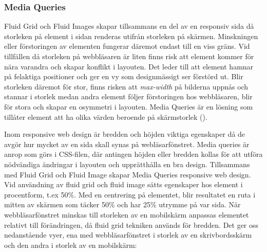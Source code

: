 \documentclass[11pt]{article}
\begin{document}
\subsubsection{Media Queries}
Fluid Grid och Fluid Images skapar tillsammans en del av en responsiv sida då storleken på element i sidan renderas utifrån storleken på skärmen. Minskningen eller förstoringen av elementen fungerar däremot endast till en viss gräns. Vid tillfällen då storleken på webbläsaren är liten finns risk att element kommer för nära varandra och skapar konflikt i layouten. Det leder till att element hamnar på felaktiga positioner och ger en vy som designmässigt ser förstörd ut. Blir storleken däremot för stor, finns risken att \textit{max-width} på bilderna uppnås och stannar i storlek medan andra element följer förstoringen hos webbläsaren, blir för stora och skapar en osymmetri i layouten. Media Queries är en lösning som tillåter element att ha olika värden beroende på skärmstorlek (\cite[s. 65]{resp}).

Inom responsive web design är bredden och höjden viktiga egenskaper då de avgör hur mycket av en sida skall synas på webläsarfönstret.  Media queries är anrop som görs i CSS-filen, där antingen höjden eller bredden kollas för att utföra nödvändiga ändringar i layouten och upprätthålla en bra design. Tillsammans med Fluid Grid och Fluid Image skapar Media Queries responsive web design. 
\newpage
Vid användning av fluid grid och fluid image sätts egenskaper hos element i procentform, t.ex 50\%. Med en centrering på elementet, blir resultatet en ruta i mitten av skärmen som täcker 50\% och har 25\% utrymme på var sida. När webbläsarfönstret minskas till storleken av en mobilskärm anpassas elementet relativt till förändringen, då fluid grid tekniken används för bredden. Det ger oss nedanstående vyer, ena med webbläsarfönstret i storlek av en skrivbordsskärm och den andra i storlek av en mobilskärm:
\end{document}
